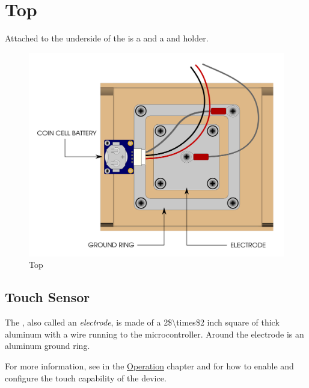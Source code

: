 \chapter{Top} \label{Top}

Attached to the underside of the  is a  and a  and holder.

\begin{figure}[H]
\centering
  \includegraphics{images/top.png}
\caption{Top}
\end{figure}

\section{Touch Sensor} \label{Touch Sensor}

The , also called an \textit{electrode}, is made of a \num{2$\times$2}
inch square of  thick aluminum with a wire running to the
microcontroller.  Around the electrode is an aluminum ground ring.

\par\medskip

For more information, see \hyperref[Operation - Touch Sensor]{} in the
\hyperref[Operation]{Operation} chapter and \hyperref[Touch Settings]{}
for how to enable and configure the touch capability of the device.

